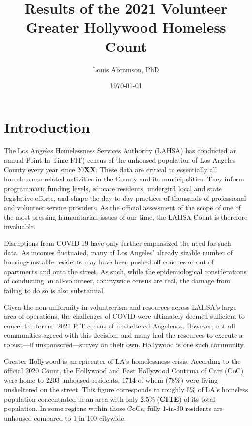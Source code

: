 \documentclass[11pt,twocolumn]{article}
\title{\bf
	Results of the 2021 Volunteer Greater Hollywood Homeless Count
	}
\author[*,$\dagger$,$\ddagger$]{Louis Abramson, PhD}%
\affil[*]{\it Hollywood 4WRD Homelessness Coalition, 6255 Sunset Blvd, Ste 150, LA, CA 90028}
\affil[$\dagger$]{\it Central Hollywood Neighborhood Council, PO Box 93907, LA, CA 90093}
\affil[$\ddagger$]{\it Carnegie Observatories, 813 Santa Barbara St, Pasadena, CA 91101}
\affil[ ]{\href{mailto:labramson.chnc@gmail.com}{labramson.chnc@gmail.com}}
\date{\today}                                           %
\def\bfr{\bf\color{red}}
\begin{document}
\maketitle

\begin{abstract}

\end{abstract}

\section{Introduction}
\label{sec:intro}

The Los Angeles Homelessness Services Authority (LAHSA) has conducted an annual Point In Time PIT) 
census of the unhoused population of Los Angeles County every year since 20{\bfr XX}. These data are critical to 
essentially all homelessness-related activities in the County and its municipalities. They inform programmatic
funding levels, educate residents, undergird local and state legislative efforts, and shape the day-to-day 
practices of thousands of professional and volunteer service providers. As the official assessment of the 
scope of one of the most pressing humanitarian issues of our time, the LAHSA Count is therefore invaluable.

Disruptions from COVID-19 have only further emphasized the need for such data. As incomes fluctuated,
many of Los Angeles' already sizable number of housing-unstable residents may have been pushed off
couches or out of apartments and onto the street. As such, while the epidemiological considerations of 
conducting an all-volunteer, countywide census are real, the damage from failing to do so is also substantial.

Given the non-uniformity in volunteerism and resources across LAHSA's large area of operations, 
the challenges of COVID were ultimately deemed sufficient to cancel the formal 2021 PIT census of 
unsheltered Angelenos. However, not all communities agreed with this decision, and many had the resources
to execute a robust---if unsponsored---survey on their own. Hollywood is one such community.

Greater Hollywood is an epicenter of LA's homelessness crisis. According to the official 2020 
Count, the Hollywood and East Hollywood Continua of Care (CoC) were home to 2203 unhoused residents,
1714 of whom (78\%) were living unsheltered on the street. This figure corresponds to roughly 5\% of LA's 
homeless population concentrated in an area with only 2.5\% ({\bfr CITE}) of its total population. In some 
regions within those CoCs, fully 1-in-30 residents are unhoused compared to 1-in-100 citywide.
\end{document}
